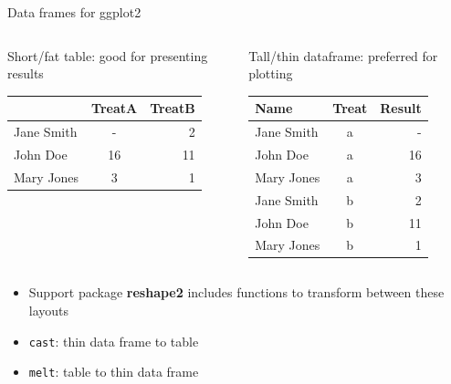 \documentclass[aspectratio=169]{beamer}\usepackage[]{graphicx}\usepackage[]{color}
\begin{document}
\begin{frame}[fragile]{Data frames for ggplot2}
\begin{columns}
  \begin{column}{0.50\textwidth}
Short/fat table: good for presenting results
\begin{tabular}{ l | c r }
  \hline
   & TreatA & TreatB \\
  \hline 
  Jane Smith & - & 2 \\
  John Doe & 16 & 11 \\
  Mary Jones & 3 & 1 \\
  \hline
\end{tabular}
\end{column}
  \begin{column}{0.5\textwidth}
Tall/thin dataframe: preferred for plotting
\begin{tabular}{ l | c | r }
  \hline 
  Name & Treat & Result \\
  \hline 
  Jane Smith & a & - \\
  John Doe & a & 16 \\
  Mary Jones & a & 3 \\
  Jane Smith & b & 2 \\
  John Doe & b & 11 \\
  Mary Jones & b & 1 \\
  \hline 
\end{tabular}

\end{column}
\end{columns}
\begin{itemize}
  \item Support package \textbf{reshape2} includes functions to transform between these layouts
  \item \texttt{cast}: thin data frame to table
  \item \texttt{melt}: table to thin data frame 
\end{itemize}
\end{frame}
\end{document}
